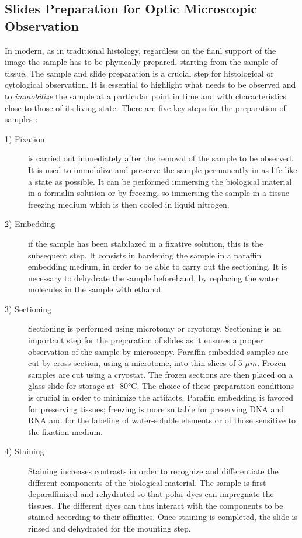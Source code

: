 \subsection{Slides Preparation for Optic Microscopic Observation} \label{ssec:samp_prep}
In modern, as in traditional histology, regardless on the fianl support of the image the sample has to be physically prepared, starting from the sample of tissue. The sample and slide preparation is a crucial step for histological or cytological observation. It is essential to highlight what needs to be observed and to \textit{immobilize} the sample at a particular point in time and with characteristics close to those of its living state. There are five key steps for the preparation of samples \cite{Alturkistani2015}:
\begin{description}
    \item [1) Fixation] is carried out immediately after the removal of the sample to be observed. It is used to immobilize and preserve the sample permanently in as life-like a state as possible. It can be performed immersing the biological material in a formalin solution or by freezing, so immersing the sample in a tissue freezing medium which is then cooled in liquid nitrogen.

    \item [2) Embedding] if the sample has been stabilazed in a fixative solution, this is the subsequent step. It consists in hardening the sample in a paraffin embedding medium, in order to be able to carry out the sectioning. It is necessary to dehydrate the sample beforehand, by replacing the water molecules in the sample with ethanol.

    \item [3) Sectioning] Sectioning is performed using microtomy or cryotomy. Sectioning is an important step for the preparation of slides as it ensures a proper observation of the sample by microscopy. Paraffin-embedded samples are cut by cross section, using a microtome, into thin slices of 5 $\mu m$. Frozen samples are cut using a cryostat. The frozen sections are then placed on a glass slide for storage at -80°C. The choice of these preparation conditions is crucial in order to minimize the artifacts. Paraffin embedding is favored for preserving tissues; freezing is more suitable for preserving DNA and RNA and for the labeling of water-soluble elements or of those sensitive to the fixation medium.

    \item [4) Staining] Staining increases contrasts in order to recognize and differentiate the different components of the biological material. The sample is first deparaffinized and rehydrated so that polar dyes can impregnate the tissues. The different dyes can thus interact with the components to be stained according to their affinities. Once staining is completed, the slide is rinsed and dehydrated for the mounting step.

\end{description}

